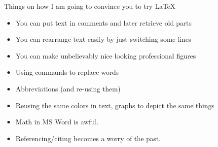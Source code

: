 \begin{frame}[fragile]{Things on how I am going to convince you to try \LaTeX}
\pause
\begin{itemize}[<+,10>]
    \item You can put text in comments and later retrieve old parts
    \item You can rearrange text easily by just switching some lines
    \item You can make unbelievably nice looking professional figures
    \item Using commands to replace words \research{}
    \item Abbreviations (and re-using them) \students{}
    \item Reusing the same colors in text, graphs to depict the same things \research{}
    \item Math in MS Word is awful.
    \item Referencing/citing becomes a worry of the past.
\end{itemize}
\end{frame}


% 
